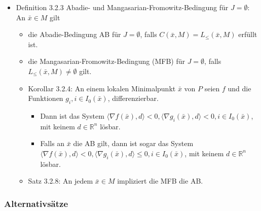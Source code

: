 \documentclass[paper=a4, fontsize=11pt]{scrartcl} %
\numberwithin{equation}{section} %
\numberwithin{figure}{section} %
\numberwithin{table}{section} %
\begin{document}
\begin{itemize}
  \item Definition 3.2.3 Abadie- und Mangasarian-Fromowitz-Bedingung für $J = \emptyset$: An $\bar{x} \in M$ gilt
  \begin{itemize}
    \item die Abadie-Bedingung AB für $J = \emptyset$, falls $C(\bar{x},M) = L_\le(\bar{x},M)$ erfüllt ist.
    \item die Mangasarian-Fromowitz-Bedingung (MFB) für $J = \emptyset$, falls $L_\le(\bar{x},M) \neq \emptyset$ gilt.
    \item Korollar 3.2.4: An einem lokalen Minimalpunkt $\bar{x}$ von $P$ seien $f$ und die Funktionen $g_i, i \in I_0(\bar{x})$, differenzierbar.
    \begin{itemize}
      \item Dann ist das System $\langle \nabla f(\bar{x}),d \rangle < 0, \langle \nabla g_i(\bar{x}),d\rangle < 0, i \in I_0(\bar{x})$, mit keinem $d \in \mathbb{R}^n$ lösbar.
      \item Falls an $\bar{x}$ die AB gilt, dann ist sogar das System $\langle \nabla f(\bar{x}),d \rangle < 0, \langle \nabla g_i(\bar{x}),d\rangle \le 0, i \in I_0(\bar{x})$, mit keinem $d \in \mathbb{R}^n$ lösbar.
    \end{itemize}
    \item Satz 3.2.8: An jedem $\bar{x} \in M$ impliziert die MFB die AB.
  \end{itemize}
\end{itemize}

\subsubsection{Alternativsätze}
\end{document}
